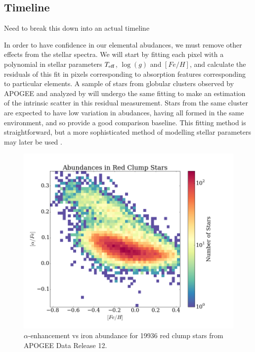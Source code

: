 \documentclass[preprint]{aastex}
\begin{document}
\subsection{Timeline}
\label{sec:timeline}

Need to break this down into an actual timeline

In order to have confidence in our elemental abudances, we must remove other effects from the stellar spectra. We will start by fitting each pixel with a polynomial in stellar parameters $T_{\rm eff}$, $\log(g)$ and $[Fe/H]$, and calculate the residuals of this fit in pixels corresponding to absorption features corresponding to particular elements. A sample of stars from globular clusters observed by APOGEE and analyzed by \citet{meszaros2015} will undergo the same fitting to make an estimation of the intrinsic scatter in this residual measurement. Stars from the same cluster are expected to have low variation in abudances, having all formed in the same environment, and so provide a good comparison baseline. This fitting method is straightforward, but a more sophisticated method of modelling stellar parameters may later be used \citep{ness2015}.

\begin{figure}%
\begin{centering}
\includegraphics[width = 0.8\linewidth]{alpha_vs_fe.png}
\caption{$\alpha$-enhancement vs iron abundance for 19936 red clump stars from APOGEE Data Release 12.}
\end{centering}
\label{fig:abun}
\end{figure}




\end{document}

